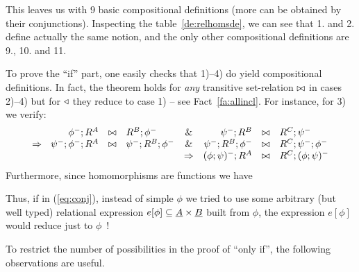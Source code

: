 \documentclass[10pt]{article}
\begin{document}
\noindent
This leaves us with 9 basic compositional definitions (more can be
obtained by their conjunctions). Inspecting the
table~\ref{de:relhomsde}, we can see that 1. and 2. define actually the same
notion, and the only other compositional definitions are 9., 10. and 11.

To prove the ``if'' part, one easily checks that 1)--4) do yield
compositional definitions. In fact, the theorem holds for {\em
any} transitive set-relation $\bowtie$ in cases 2)--4) but for
$\triangleleft$ they reduce to case 1) -- see Fact~\ref{fa:allincl}.
For instance, for 3) we verify:
\[ 
\begin{array}{rclcrcl} 
\phi^-;R^A &\any & R^B;\phi^- & 
         \& &  \psi^-;R^B & \any & R^C;\psi^- \\
\impl\ \ \psi^-;\phi^-;R^A & \any & \psi^-;R^B;\phi^- & 
         \& & \psi^-;R^B;\phi^- &\any &R^C;\psi^-;\phi^-   \\%
& & & \impl & (\phi;\psi)^-;R^A & \any & R^C;(\phi;\psi)^-
\end{array}
\]
Furthermore, since homomorphisms are functions we have

Thus, if in (\ref{eq:conj}), instead of simple $\phi$ we tried to use
some arbitrary (but well typed) relational expression
$e[\phi]\subseteq \underline {A}\times\underline {B}$ built from $\phi$, the
expression $e[\phi]$ would reduce just to $\phi$~!
\medskip

To restrict the number of possibilities in the proof of ``only if'',
the following observations are useful.
\end{document}
